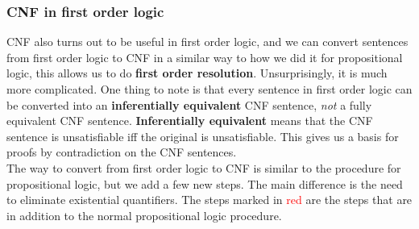 \documentclass{article}
\newcommand{\n}[0]{\\[\baselineskip]}
\begin{document}
\subsubsection{CNF in first order logic}
CNF also turns out to be useful in first order logic, and we can convert sentences from first order logic to CNF in a similar way to how we did it for propositional logic, this allows us to do \textbf{first order resolution}. Unsurprisingly, it is much more complicated. One thing to note is that every sentence in first order logic can be converted into an \textbf{inferentially equivalent} CNF sentence, \textit{not} a fully equivalent CNF sentence. \textbf{Inferentially equivalent} means that the CNF sentence is unsatisfiable iff the original is unsatisfiable. This gives us a basis for proofs by contradiction on the CNF sentences.
\n
The way to convert from first order logic to CNF is similar to the procedure for propositional logic, but we add a few new steps. The main difference is the need to eliminate existential quantifiers. The steps marked in \textcolor{red}{red} are the steps that are in addition to the normal propositional logic procedure.
\end{document}
